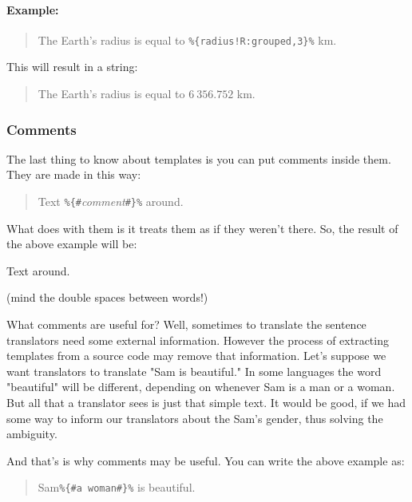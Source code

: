 \paragraph{Example:}
\begin{quote}
  The Earth's radius is equal to \verb+%{radius!R:grouped,3}%+ km.
\end{quote}
This will result in a string:
\begin{quote}
  The Earth's radius is equal to $6~356.752$ km.
\end{quote}

\subsubsection{Comments} The last thing to know about \mulan{} templates is you can put comments inside them.
They are made in this way:
\begin{quote}
	Text \verb+%{#+\textit{comment}\verb+#}%+ around.
\end{quote}
What \mulan{} does with them is it treats them as if they weren't there. So, the result of the above example will be:
\begin{verbatim*}
Text  around.
\end{verbatim*}(mind the double spaces between words!)

What comments are useful for? Well, sometimes to translate the sentence translators need some external information. 
However the process of extracting templates from a source code may remove that information. Let's suppose we want translators to translate "Sam is beautiful."
In some languages the word "beautiful" will be different, depending on whenever Sam is a man or a woman. But all that a translator sees is just that simple text.
It would be good, if we had some way to inform our translators about the Sam's gender, thus solving the ambiguity. 

And that's is why comments may be useful. You can write the above example as: 
\begin{quote}
  Sam\verb+%{#a woman#}%+ is beautiful.
\end{quote}
